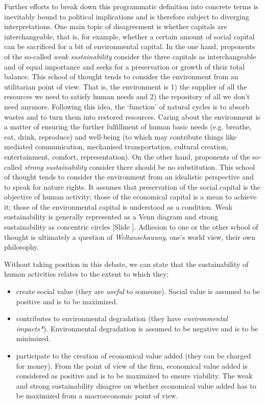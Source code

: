 \documentclass{article}
\newcounter{slide}
\begin{document}
Further efforts to break down this programmatic definition into concrete terms is inevitably bound to political implications and is therefore subject to diverging interpretations. One main topic of disagreement is whether capitals are interchangeable, that is, for example, whether a certain amount of social capital can be sacrificed for a bit of environmental capital. In the one hand, proponents of the so-called \emph{weak sustainability} consider the three capitals as interchangeable and of equal importance and seeks for a preservation or growth of their total balance. This school of thought tends to consider the environment from an utilitarian point of view. That is, the environment is 1) the supplier of all the resources we need to satisfy human needs and 2) the repository of all we don't need anymore. Following this idea, the `function' of natural cycles is to absorb wastes and to turn them into restored resources. Caring about the environment is a matter of ensuring the further fulfillment of human basic needs (e.g. breathe, eat, drink, reproduce) and well-being (to which may contribute things like mediated communication, mechanised transportation, cultural creation, entertainment, comfort, representation). On the other hand, proponents of the so-called \emph{strong sustainability} consider there should be no substitution. This school of thought tends to consider the environment from an idealistic perspective and to speak for nature rights. It assumes that preservation of the social capital is the objective of human activity; those of the economical capital is a mean to achieve it; those of the environmental capital is understood as a condition. Weak sustainability is generally represented as a Venn diagram and strong sustainability as concentric circles {\color{blue}[Slide ]}. Adhesion to one or the other school of thought is ultimately a question of \emph{Weltanschauung}, one's world view, their own philosophy.

Without taking position in this debate, we can state that the sustainability of human activities relates to the extent to which they:
\begin{itemize}
	\item create social value (they are \emph{useful} to someone). Social value is assumed to be positive and is to be maximized. 
	\item contributes to environmental degradation (they have \emph{environmental impacts*}). Environmental degradation is assumed to be negative and is to be minimized.
	\item participate to the creation of economical value added (they can be charged for money). From the point of view of the firm, economical value added is considered as positive and is to be maximized to ensure viability. The weak and strong sustainability disagree on whether economical value added has to be maximized from a macroeconomic point of view.
\end{itemize}
\end{document}
